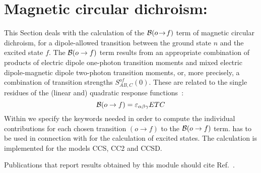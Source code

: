 
\section{Magnetic circular dichroism: }\label{sec:ccmcd}

This Section deals with the calculation of the 
${\cal{B}}(o\!\to\!f)$ term of magnetic circular dichroism,
for a dipole-allowed transition between the ground state $n$ and 
the excited state $f$.
The ${\cal{B}}(o\to f)$ term results from an appropriate combination of
products of electric dipole one-photon transition moments 
and mixed electric dipole-magnetic dipole
two-photon transition moments,
or, more precisely, a combination of transition strengths
$S_{AB,C}^{of}(0)$.
These are related to the single residues of the (linear and) 
quadratic response functions~\cite{MCDRSP,MOACC,SC:PHD}:
\[
{\cal{B}}(o\to f) = \varepsilon_{\alpha\beta\gamma} ETC
\]
%
\noindent
Within  we specify the keywords needed in order
to compute the individual 
contributions for each chosen transition $(o\to f)$ to the
${\cal{B}}(o\to f)$ term.  has to be used in 
connection with  for the calculation of 
excited states.
The calculation is implemented for the models CCS, CC2 and CCSD.

\noindent Publications that report results obtained by this module
should cite Ref.\ \cite{MOACC}.

